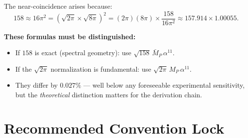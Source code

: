 \documentclass[11pt]{article}
\newcommand{\MP}{M_P}
\newcommand{\MPbar}{\bar{M}_P}
\begin{document}
The near-coincidence arises because:
\begin{equation}
  158 \approx 16\pi^2 = (\sqrt{2\pi} \times \sqrt{8\pi})^2
  = (2\pi)({8\pi}) \times \frac{158}{16\pi^2}
  \approx 157.914 \times 1.00055.
\end{equation}

\textbf{These formulas must be distinguished:}
\begin{itemize}
\item If $158$ is exact (spectral geometry): use $\sqrt{158}\,\MPbar\,\alpha^{11}$.
\item If the $\sqrt{2\pi}$ normalization is fundamental: use
  $\sqrt{2\pi}\,\MP\,\alpha^{11}$.
\item They differ by $0.027\%$ --- well below any foreseeable experimental
  sensitivity, but the \textit{theoretical} distinction matters for the
  derivation chain.
\end{itemize}

\section{Recommended Convention Lock}
\end{document}
